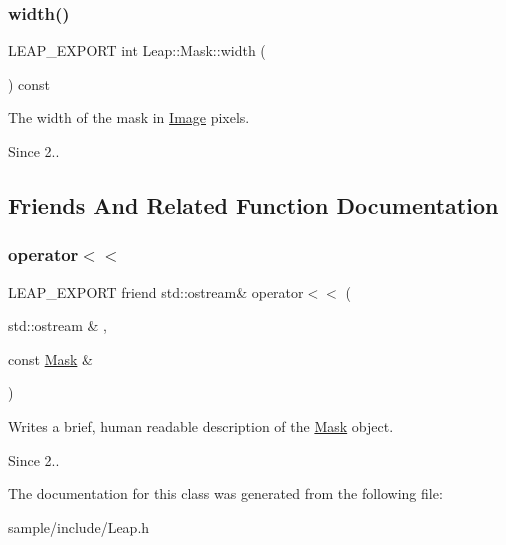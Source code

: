 \subsubsection{\texorpdfstring{width()}{width()}}
{\footnotesize\ttfamily L\+E\+A\+P\+\_\+\+E\+X\+P\+O\+RT int Leap\+::\+Mask\+::width (\begin{DoxyParamCaption}{ }\end{DoxyParamCaption}) const}

The width of the mask in \hyperlink{class_leap_1_1_image}{Image} pixels. 
\begin{DoxyCodeInclude}
\end{DoxyCodeInclude}
 \begin{DoxySince}{Since}
2.. 
\end{DoxySince}


\subsection{Friends And Related Function Documentation}
\mbox{\label{class_leap_1_1_mask_a5905cc939d0e7c29749499cde771dfce}} 
\subsubsection{\texorpdfstring{operator$<$$<$}{operator<<}}
{\footnotesize\ttfamily L\+E\+A\+P\+\_\+\+E\+X\+P\+O\+RT friend std\+::ostream\& operator$<$$<$ (\begin{DoxyParamCaption}\item[{std\+::ostream \&}]{,  }\item[{const \hyperlink{class_leap_1_1_mask}{Mask} \&}]{ }\end{DoxyParamCaption})\hspace{0.3cm}{\ttfamily [friend]}}

Writes a brief, human readable description of the \hyperlink{class_leap_1_1_mask}{Mask} object. \begin{DoxySince}{Since}
2.. 
\end{DoxySince}


The documentation for this class was generated from the following file\+:\begin{DoxyCompactItemize}
\item 
sample/include/Leap.\+h\end{DoxyCompactItemize}
